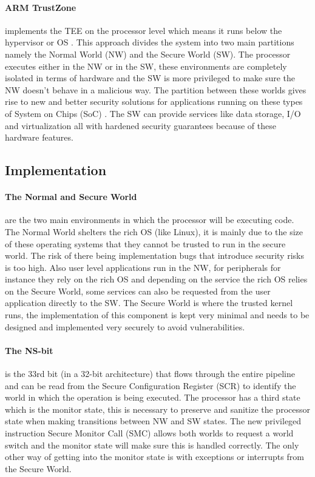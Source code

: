 \documentclass{report}
\begin{document}
\paragraph*{ARM TrustZone}
\cite{TrustZone} implements the TEE on the processor level which means it runs below the hypervisor or OS \cite{PintoSandro2019DATA}. This approach divides the system into two main partitions namely the Normal World (NW) and the Secure World (SW). The processor executes either in the NW or in the SW, these environments are completely isolated in terms of hardware and the SW is more privileged to make sure the NW doesn't behave in a malicious way. The partition between these worlds gives rise to new and better security solutions for applications running on these types of System on Chips (SoC) \cite{LentzMatthew2018SATM} \cite{EskandarianSaba2018FPUS} \cite{ChangRui2017Mapm} \cite{FerraiuoloAndrew2017KUvt}. The SW can provide services like data storage, I/O and virtualization all with hardened security guarantees because of these hardware features.  

\subsection*{Implementation}

\paragraph*{The Normal and Secure World}
are the two main environments in which the processor will be executing code. The Normal World shelters the rich OS (like Linux), it is mainly due to the size of these operating systems that they cannot be trusted to run in the secure world. The risk of there being implementation bugs that introduce security risks is too high. Also user level applications run in the NW, for peripherals for instance they rely on the rich OS and depending on the service the rich OS relies on the Secure World, some services can also be requested from the user application directly to the SW. The Secure World is where the trusted kernel runs, the implementation of this component is kept very minimal and needs to be designed and implemented very securely to avoid vulnerabilities.

\paragraph*{The NS-bit}
is the 33rd bit (in a 32-bit architecture) that flows through the entire pipeline and can be read from the Secure Configuration Register (SCR) to identify the world in which the operation is being executed. The processor has a third state which is the monitor state, this is necessary to preserve and sanitize the processor state when making transitions between NW and SW states. The new privileged instruction Secure Monitor Call (SMC) allows both worlds to request a world switch and the monitor state will make sure this is handled correctly. The only other way of getting into the monitor state is with exceptions or interrupts from the Secure World.
\end{document}
